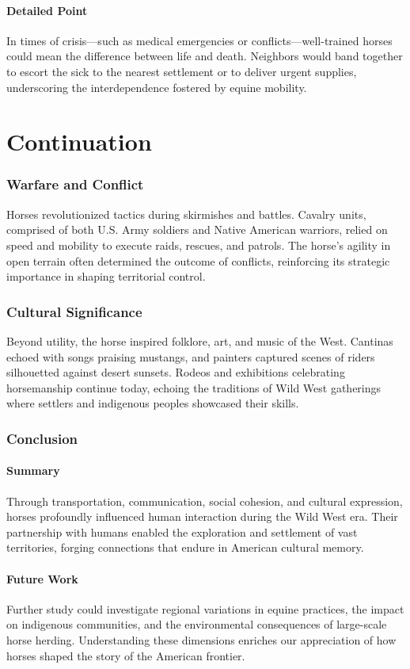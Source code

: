 \documentclass[11pt]{report}
\begin{document}
\subsection{Detailed Point}
In times of crisis—such as medical emergencies or conflicts—well-trained horses could mean the difference between life and death. Neighbors would band together to escort the sick to the nearest settlement or to deliver urgent supplies, underscoring the interdependence fostered by equine mobility.

\newpage

\part{Continuation}

\section{Warfare and Conflict}
Horses revolutionized tactics during skirmishes and battles. Cavalry units, comprised of both U.S. Army soldiers and Native American warriors, relied on speed and mobility to execute raids, rescues, and patrols. The horse’s agility in open terrain often determined the outcome of conflicts, reinforcing its strategic importance in shaping territorial control.

\section{Cultural Significance}
Beyond utility, the horse inspired folklore, art, and music of the West. Cantinas echoed with songs praising mustangs, and painters captured scenes of riders silhouetted against desert sunsets. Rodeos and exhibitions celebrating horsemanship continue today, echoing the traditions of Wild West gatherings where settlers and indigenous peoples showcased their skills.

\section{Conclusion}

\subsection{Summary}
Through transportation, communication, social cohesion, and cultural expression, horses profoundly influenced human interaction during the Wild West era. Their partnership with humans enabled the exploration and settlement of vast territories, forging connections that endure in American cultural memory.

\subsection{Future Work}
Further study could investigate regional variations in equine practices, the impact on indigenous communities, and the environmental consequences of large-scale horse herding. Understanding these dimensions enriches our appreciation of how horses shaped the story of the American frontier.
\end{document}
